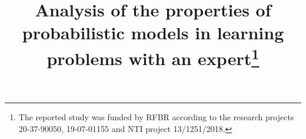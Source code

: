 %
%
%
%
%
\RequirePackage{fix-cm}
%
\documentclass[smallextended]{svjour3}       %
%
\smartqed  %
%
\usepackage{graphicx}
\usepackage{subfig}
\usepackage{amsmath}
\usepackage{amsfonts}
%
%
%
%
%


\title{Analysis of the properties of probabilistic models in learning problems with an expert\thanks{The reported study was funded by RFBR according to the research projects 20-37-90050, 19-07-01155 and NTI project 13/1251/2018.}
}
\subtitle{}


\author{}


\institute{}

